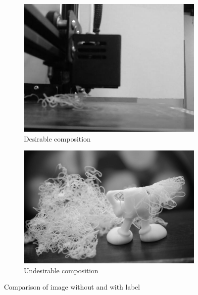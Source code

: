 \documentclass[12pt,a4paper]{article}
\begin{document}
\begin{figure}[h]
    \centering
    \begin{subfigure}[b]{0.45\textwidth}
        \centering
        \includegraphics[width=\textwidth]{no_support_57.jpg}
        \caption{Desirable composition \cite{onlineOpenSource2}}
        \label{fig:compositionDesirable}
    \end{subfigure}
    \begin{subfigure}[b]{0.45\textwidth}
        \centering
        \includegraphics[width=\textwidth]{wholespaghetti.jpg}
        \caption{Undesirable composition\cite{onlineOpenSource1}}
        \label{fig:compositionUndesirable}
    \end{subfigure}
    \hfill

    \caption{Comparison of image without and with label}
    \label{fig:test}
\end{figure}
\end{document}

